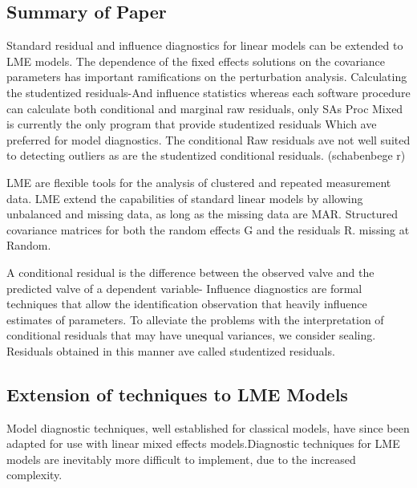 \documentclass[12pt, a4paper]{article}
\begin{document}
\subsection{Summary of Paper}
Standard residual and influence diagnostics for linear models can be extended to LME models.
The dependence of the fixed effects solutions on the covariance parameters has important ramifications on the perturbation analysis.	
Calculating the studentized residuals-And influence statistics whereas each software procedure can calculate both conditional and marginal raw residuals, only SAs Proc Mixed is currently the only program that provide studentized residuals Which ave preferred for model diagnostics. The conditional Raw residuals ave not well suited to detecting outliers as are the studentized conditional residuals. (schabenbege r)


LME are flexible tools for the analysis of clustered and repeated measurement data. LME extend the capabilities of standard linear models by allowing unbalanced and missing data, as long as the missing data are MAR. Structured covariance matrices for both the random effects G and the residuals R. missing at Random.

A conditional residual is the difference between the observed valve and the predicted valve of a dependent variable- Influence diagnostics are formal techniques that allow the identification observation that heavily influence estimates of parameters.
To alleviate the problems with the interpretation of conditional residuals that may have unequal variances, we consider sealing.
Residuals obtained in this manner ave called studentized residuals.




\subsection*{Extension of techniques to LME Models} %
			
			Model diagnostic techniques, well established for classical models, have since been adapted for use with linear mixed effects models.Diagnostic techniques for LME models are inevitably more difficult to implement, due to the increased complexity.
			


			
\end{document}
